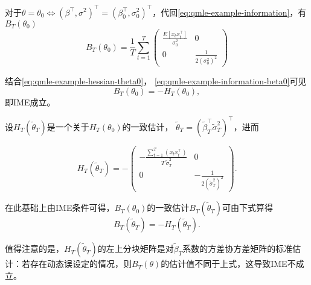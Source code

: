 对于$\theta = \theta_{0} \Longleftrightarrow \left( \beta^{\top} , \sigma^{2} \right)^{\top} = \left( \beta_{0}^{\top} , \sigma_{0}^{2} \right)^{\top}$，代回\eqref{eq:qmle-example-information}，有$B_{T} \left( \theta_{0} \right)$
\begin{equation}
    \label{eq:qmle-example-information-beta0}
    B_{T} \left( \theta_{0} \right)
    = \frac{1}{T} \sum_{t=1}^{T}
    \begin{pmatrix}
        \frac{
        E \left[ x_{t} x_{t}^{\top} \right]
        }{
        \sigma_{0}^{2}
        } & 0 \\
        0 & \frac{1}{2 \left( \sigma_{0}^{2} \right)^{2}}
    \end{pmatrix}
\end{equation}

结合\eqref{eq:qmle-example-hessian-theta0}，
\eqref{eq:qmle-example-information-beta0}可见
\begin{equation*}
    B_{T} \left( \theta_{0} \right) = - H_{T} \left( \theta_{0} \right),
\end{equation*}
即IME成立。

设$H_{T} \left( \tilde{\theta}_{T} \right)$是一个关于$H_{T} \left( \theta_{0} \right)$的一致估计，
$\tilde{\theta}_{T} = \left( \tilde{\beta}_{T}^{\top} \tilde{\sigma}_{T}^{2} \right)^{\top}$，进而

\begin{equation}
    \label{eq:qmle-example-hessian-theta-consistent}
    H_{T} \left( \tilde{\theta}_{T} \right)
    = -
    \begin{pmatrix}
        - \frac{
        \sum_{t=1}^{T} \left( x_{t} x_{t}^{\top} \right)
        }{
        T \, \tilde{\sigma}_{T}^{2}
        }
        & 0 \\
        0 & - \frac{1}{2 \left( \tilde{\sigma}_{T}^{2} \right)^{2}}
    \end{pmatrix}.
\end{equation}

在此基础上由IME条件可得，$B_{T} \left( \theta_{0} \right)$的一致估计$B_{T} \left( \tilde{\theta}_{T} \right)$可由下式算得
\begin{equation*}
    B_{T} \left( \tilde{\theta}_{T} \right) = - H_{T} \left( \tilde{\theta}_{T} \right).
\end{equation*}

值得注意的是，$H_{T} \left( \tilde{\theta}_{T} \right)$的左上分块矩阵是对$\tilde{\beta}_{T}$系数的方差协方差矩阵的标准估计：若存在动态误设定的情况，则$B_{T} \left( \theta \right)$的估计值不同于上式，这导致IME不成立。

